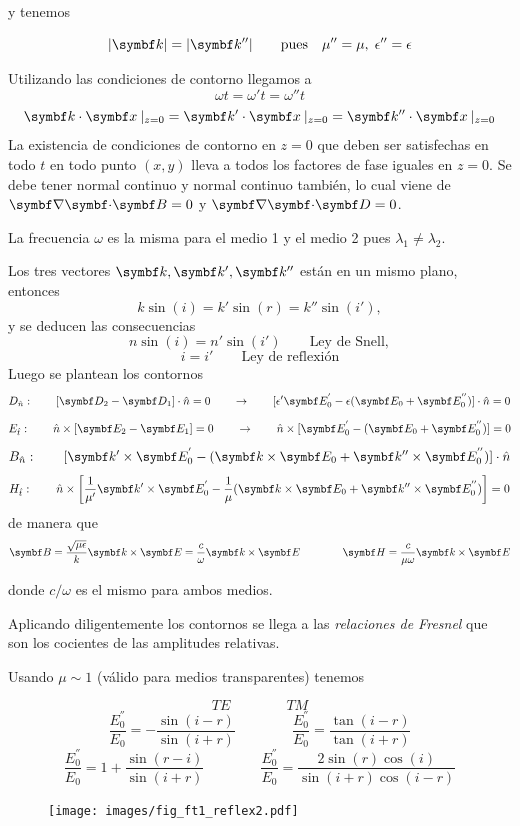 \documentclass[10pt,oneside]{CBFT_book}
\begin{document}
y tenemos 

\[
	|\vb{k}| = |\vb{k}''| \qquad \text{pues} \quad \mu''= \mu,\; \epsilon''=\epsilon
\]

Utilizando las condiciones de contorno llegamos a
\[
	\omega t = \omega' t = \omega'' t
\]
\[
	\pe{k}{x}\:|_{z=0} = \pe{k'}{x}\:|_{z=0}  = \pe{k''}{x}\:|_{z=0} 
\]
La existencia de condiciones de contorno en $z=0$ que deben ser satisfechas en todo $t$ en todo punto $(x,y)$ lleva a 
todos los factores de fase iguales en $z=0$. Se debe tener  normal continuo y  normal continuo también, lo 
cual viene de $\divem{B}=0$ y $\divem{D}=0$.

La frecuencia $\omega$ es la misma para el medio 1 y el medio 2 pues $\lambda_1 \neq \lambda_2$.

Los tres vectores $\vb{k}, \vb{k}', \vb{k}''$ están en un mismo plano, entonces 
\[
	k \sin(i) = k' \sin(r) = k'' \sin(i'),
\]
y se deducen las consecuencias
\[
	n \sin (i) = n' \sin(i') \qquad \text{Ley de Snell},
\]
\[
	i = i' \qquad \text{Ley de reflexión}
\]
Luego se plantean los contornos 
\[
	D_{\hat{n}} : \qquad [ \vb{D}_2 - \vb{D}_1 ]\cdot\hat{n} = 0 \qquad \rightarrow  \qquad 
		[ \epsilon'\vb{E}_0^{'} - \epsilon (\vb{E}_0 + \vb{E}_0^{''} )  ]\cdot\hat{n} = 0
\]
\[
	E_{\hat{t}} : \qquad \hat{n} \times [ \vb{E}_2 - \vb{E}_1 ] = 0 \qquad \rightarrow \qquad 
		\hat{n} \times [ \vb{E}_0^{'} - (\vb{E}_0 + \vb{E}_0^{''} )  ]  = 0
\]
\[
	B_{\hat{n}} : \qquad  [ \vb{k}' \times \vb{E}_0^{'} - ( \vb{k} \times \vb{E}_0 + 
			\vb{k}'' \times \vb{E}_0^{''} )  ]\cdot\hat{n} 
\]
\[
	H_{\hat{t}} : \qquad  \hat{n} \times \left[ \frac{1}{\mu'}\vb{k}' \times \vb{E}_0^{'} - 
			\frac{1}{\mu}( \vb{k} \times \vb{E}_0 + \vb{k}'' \times \vb{E}_0^{''} ) \right]  = 0
\]
de manera que 
\[
	\vb{B} = \frac{\sqrt{\mu\epsilon}}{k} \pv{k}{E} = \frac{c}{\omega} \pv{k}{E} \qquad \qquad 
	\vb{H} = \frac{c}{\mu \omega } \pv{k}{E}
\]

donde $c/\omega$ es el mismo para ambos medios.

Aplicando diligentemente los contornos se llega a las {\it relaciones de Fresnel} que son los cocientes de las 
amplitudes relativas.

Usando $\mu \sim 1$ (válido para medios transparentes) tenemos

\[
	TE \qquad \qquad TM
\]
\[
	\frac{E_0^{''}}{E_0} = -\frac{\sin(i-r)}{\sin(i+r)} \qquad \qquad 
	\frac{E_0^{''}}{E_0} = \frac{\tan(i-r)}{\tan(i+r)} 
\]
\[
	\frac{E_0^{''}}{E_0} = 1 + \frac{\sin(r-i)}{\sin(i+r)} \qquad \qquad 
	\frac{E_0^{''}}{E_0} = \frac{2 \sin(r)\cos(i)}{\sin(i+r)\cos(i-r)} 
\]
\begin{figure}[htb]
	\begin{center}
	\texttt{[image: images/fig\_ft1\_reflex2.pdf]}	 
	\end{center}
	\caption{}
\end{figure} 
\end{document}
